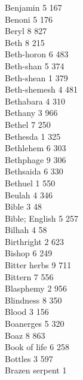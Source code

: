 Benjamin \hfill 5 \quad \phantom{0}167\\
Benoni \hfill 5 \quad \phantom{0}176\\
Beryl \hfill 8 \quad \phantom{0}827\\
Beth \hfill 8 \quad \phantom{0}215\\
Beth-horon \hfill 6 \quad \phantom{0}483\\
Beth-shan \hfill 5 \quad \phantom{0}374\\
Beth-shean \hfill 1 \quad \phantom{0}379\\
Beth-shemesh \hfill 4 \quad \phantom{0}481\\
Bethabara \hfill 4 \quad \phantom{0}310\\
Bethany \hfill 3 \quad \phantom{0}966\\
Bethel \hfill 7 \quad \phantom{0}250\\
Bethesda \hfill 1 \quad \phantom{0}325\\
Bethlehem \hfill 6 \quad \phantom{0}303\\
Bethphage \hfill 9 \quad \phantom{0}306\\
Bethsaida \hfill 6 \quad \phantom{0}330\\
Bethuel \hfill 1 \quad \phantom{0}550\\
Beulah \hfill 4 \quad \phantom{0}346\\
Bible \hfill 3 \quad \phantom{0}\phantom{0}48\\
Bible; English \hfill 5 \quad \phantom{0}257\\
Bilhah \hfill 4 \quad \phantom{0}\phantom{0}58\\
Birthright \hfill 2 \quad \phantom{0}623\\
Bishop \hfill 6 \quad \phantom{0}249\\
Bitter herbs \hfill 9 \quad \phantom{0}711\\
Bittern \hfill 7 \quad \phantom{0}556\\
Blasphemy \hfill 2 \quad \phantom{0}956\\
Blindness \hfill 8 \quad \phantom{0}350\\
Blood \hfill 3 \quad \phantom{0}156\\
Boanerges \hfill 5 \quad \phantom{0}320\\
Boaz \hfill 8 \quad \phantom{0}863\\
Book of life \hfill 6 \quad \phantom{0}258\\
Bottles \hfill 3 \quad \phantom{0}597\\
Brazen serpent \hfill 1 \\
